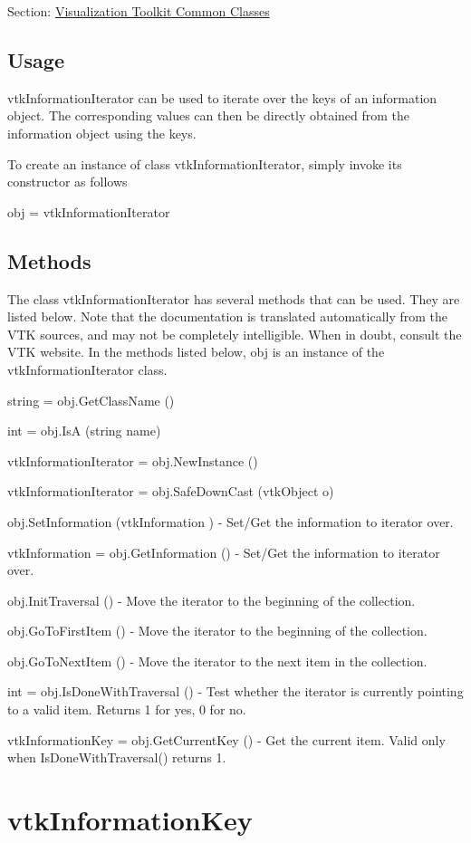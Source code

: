Section\-: \hyperlink{sec_vtkcommon}{Visualization Toolkit Common Classes} \hypertarget{vtkwidgets_vtkxyplotwidget_Usage}{}\subsection{Usage}\label{vtkwidgets_vtkxyplotwidget_Usage}
vtk\-Information\-Iterator can be used to iterate over the keys of an information object. The corresponding values can then be directly obtained from the information object using the keys.

To create an instance of class vtk\-Information\-Iterator, simply invoke its constructor as follows \begin{DoxyVerb}  obj = vtkInformationIterator
\end{DoxyVerb}
 \hypertarget{vtkwidgets_vtkxyplotwidget_Methods}{}\subsection{Methods}\label{vtkwidgets_vtkxyplotwidget_Methods}
The class vtk\-Information\-Iterator has several methods that can be used. They are listed below. Note that the documentation is translated automatically from the V\-T\-K sources, and may not be completely intelligible. When in doubt, consult the V\-T\-K website. In the methods listed below, {\ttfamily obj} is an instance of the vtk\-Information\-Iterator class. 
\begin{DoxyItemize}
\item {\ttfamily string = obj.\-Get\-Class\-Name ()}  
\item {\ttfamily int = obj.\-Is\-A (string name)}  
\item {\ttfamily vtk\-Information\-Iterator = obj.\-New\-Instance ()}  
\item {\ttfamily vtk\-Information\-Iterator = obj.\-Safe\-Down\-Cast (vtk\-Object o)}  
\item {\ttfamily obj.\-Set\-Information (vtk\-Information )} -\/ Set/\-Get the information to iterator over.  
\item {\ttfamily vtk\-Information = obj.\-Get\-Information ()} -\/ Set/\-Get the information to iterator over.  
\item {\ttfamily obj.\-Init\-Traversal ()} -\/ Move the iterator to the beginning of the collection.  
\item {\ttfamily obj.\-Go\-To\-First\-Item ()} -\/ Move the iterator to the beginning of the collection.  
\item {\ttfamily obj.\-Go\-To\-Next\-Item ()} -\/ Move the iterator to the next item in the collection.  
\item {\ttfamily int = obj.\-Is\-Done\-With\-Traversal ()} -\/ Test whether the iterator is currently pointing to a valid item. Returns 1 for yes, 0 for no.  
\item {\ttfamily vtk\-Information\-Key = obj.\-Get\-Current\-Key ()} -\/ Get the current item. Valid only when Is\-Done\-With\-Traversal() returns 1.  
\end{DoxyItemize}\hypertarget{vtkcommon_vtkinformationkey}{}\section{vtk\-Information\-Key}\label{vtkcommon_vtkinformationkey}
